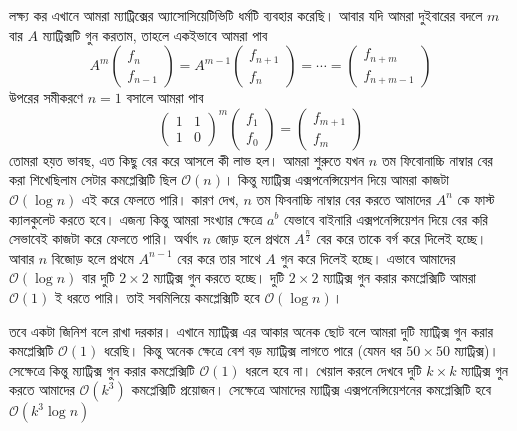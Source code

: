লক্ষ্য কর এখানে আমরা ম্যাট্রিক্সের অ্যাসোসিয়েটিভিটি ধর্মটি ব্যবহার করেছি। আবার যদি আমরা দুইবারের বদলে $m$ বার $A$ ম্যাট্রিক্সটি গুন করতাম, তাহলে  একইভাবে আমরা পাব
$$
A^m
\begin{pmatrix}
f_{n} \\
f_{n - 1}
\end{pmatrix}
=
A^{m-1}
\begin{pmatrix}
f_{n + 1} \\
f_{n}
\end{pmatrix}
= \cdots =
\begin{pmatrix}
f_{n + m} \\
f_{n + m - 1}
\end{pmatrix}
$$
উপরের সমীকরণে $n = 1$ বসালে আমরা পাব
$$
\begin{pmatrix}
1 & 1 \\
1 & 0
\end{pmatrix} ^ {m}
\begin{pmatrix}
f_{1} \\
f_{0}
\end{pmatrix}
=
\begin{pmatrix}
f_{m + 1} \\
f_{m}
\end{pmatrix}
$$
তোমরা হয়ত ভাবছ, এত কিছু বের করে আসলে কী লাভ হল। আমরা শুরুতে যখন $n$ তম ফিবোনাচ্চি নাম্বার বের করা শিখেছিলাম সেটার কমপ্লেক্সিটি ছিল $\mathcal{O}(n)$।  কিন্তু ম্যাট্রিক্স এক্সপনেন্সিয়েশন দিয়ে আমরা কাজটা $\mathcal{O}(\log{n})$ এই করে ফেলতে পারি। কারণ দেখ, $n$ তম ফিবনাচ্চি নাম্বার বের করতে আমাদের $A^{n}$ কে ফাস্ট ক্যালকুলেট করতে হবে। এজন্য কিন্তু আমরা সংখ্যার ক্ষেত্রে $a^b$ যেভাবে বাইনারি  এক্সপনেন্সিয়েশন দিয়ে বের করি সেভাবেই কাজটা করে ফেলতে পারি। অর্থাৎ $n$ জোড় হলে প্রথমে $A^{\frac{n}{2}}$ বের করে তাকে বর্গ করে দিলেই হচ্ছে। আবার $n$ বিজোড় হলে প্রথমে $A^{n - 1}$ বের করে তার সাথে $A$ গুন করে দিলেই হচ্ছে। এভাবে আমাদের $\mathcal{O}(\log{n})$ বার দুটি $2 \times 2$ ম্যাট্রিক্স গুন করতে হচ্ছে। দুটি $2 \times 2$ ম্যাট্রিক্স গুন করার কমপ্লেক্সিটি আমরা $\mathcal{O}(1)$ ই ধরতে পারি। তাই সবমিলিয়ে কমপ্লেক্সিটি হবে $\mathcal{O}(\log{n})$।

তবে একটা জিনিশ বলে রাখা দরকার। এখানে ম্যাট্রিক্স এর আকার অনেক ছোট বলে আমরা দুটি ম্যাট্রিক্স গুন করার কমপ্লেক্সিটি $\mathcal{O}(1)$ ধরেছি। কিন্তু অনেক ক্ষেত্রে বেশ বড় ম্যাট্রিক্স লাগতে পারে (যেমন ধর $50 \times 50$ ম্যাট্রিক্স)। সেক্ষেত্রে কিন্তু ম্যাট্রিক্স গুন করার কমপ্লেক্সিটি $\mathcal{O}(1)$ ধরলে হবে না। খেয়াল করলে দেখবে দুটি $k \times k$ ম্যাট্রিক্স গুন করতে আমাদের $\mathcal{O}(k^3)$ কমপ্লেক্সিটি প্রয়োজন। সেক্ষেত্রে আমাদের ম্যাট্রিক্স এক্সপনেন্সিয়েশনের কমপ্লেক্সিটি হবে $\mathcal{O}(k^{3} \log{n})$

